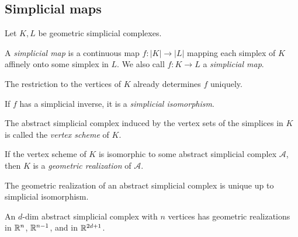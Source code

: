 \begin{multicols*}{3}
\subsection{Simplicial maps}
Let $K,L$ be geometric simplicial complexes. 
\vspace{-0.5pc}
\begin{definition}A \emph{simplicial map} is a continuous map $f: |K| \to |L|$ mapping each simplex of $K$ affinely onto some simplex in $L$. We also call $f: K \to L$ a \emph{simplicial map}. 
\end{definition}
\rspace
\begin{rem}%
The restriction to the vertices of $K$ already determines $f$ uniquely.
\end{rem}
\rspace
\begin{definition} If $f$ has a simplicial inverse, it is a \emph{simplicial isomorphism}.
\end{definition}
\rspace
\drawaline
\vspace{-1.5pc}
\begin{definition}
The abstract simplicial complex induced by the vertex sets of the simplices in $K$ is called the \emph{vertex scheme} of $K$. 
\end{definition}
\rspace
\begin{defi}
If the vertex scheme of $K$ is isomorphic to some abstract simplicial complex $\mathcal{A}$, then $K$ is a \emph{geometric realization} of $\mathcal{A}$.
\end{defi}
\rspace
\begin{rem}
The geometric  realization of an abstract simplicial complex is unique up to simplicial isomorphism.
\end{rem}
\rspace
\begin{remark} 
An $d$-dim abstract simplicial complex with $n$ vertices has geometric realizations in $\mathbb{R}^n$, $\mathbb{R}^{n-1}$, and in $\mathbb{R}^{2d+1}$.
\end{remark}
\rspace

\end{multicols*}
